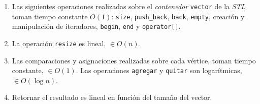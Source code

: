 \begin{enumerate}
   \item Las siguientes operaciones realizadas sobre el \textit{contenedor} \verb|vector| de la \textit{STL} toman tiempo constante $O(1)$:
   \verb|size|, \verb|push_back|, \verb|back|, \verb|empty|, creación y manipulación de iteradores, \verb|begin|, \verb|end| 
   y \verb|operator[]|.
 
   \item La operación \verb|resize| es lineal, $\in O(n)$.
% 
% 
% 
% 
% 
 
 
   \item Las comparaciones y asignaciones realizadas sobre cada vértice, toman tiempo constante,  $\in O(1)$. 
   Las operaciones \verb|agregar| y \verb|quitar| son logarítmicas, $\in O(\log n)$.
 
   \item Retornar el resultado es lineal en función del tamaño del vector.
 \end{enumerate}
 

